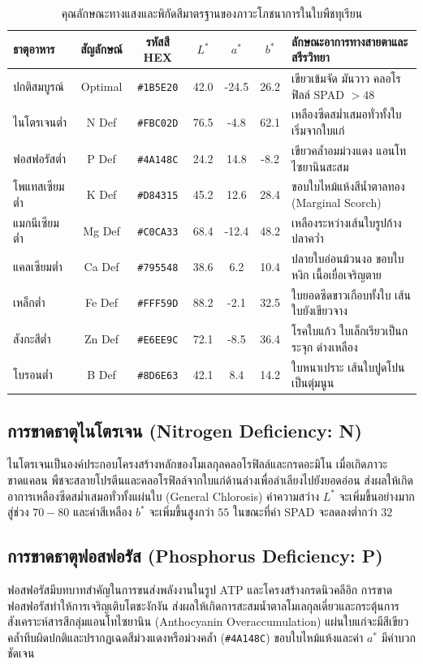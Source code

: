 \begin{table}[h]
\centering
\caption{คุณลักษณะทางแสงและพิกัดสีมาตรฐานของภาวะโภชนาการในใบพืชทุเรียน}
\label{tab:nutrient_color_profiles}
\small
\begin{tabular}{|l|c|c|c|c|c|l|}
\hline
\textbf{ธาตุอาหาร} & \textbf{สัญลักษณ์} & \textbf{รหัสสี HEX} & $L^*$ & $a^*$ & $b^*$ & \textbf{ลักษณะอาการทางสายตาและสรีรวิทยา} \\
\hline
ปกติสมบูรณ์ & Optimal & \texttt{\#1B5E20} & 42.0 & -24.5 & 26.2 & เขียวเข้มจัด มันวาว คลอโรฟิลล์ SPAD $>48$ \\
ไนโตรเจนต่ำ & N Def & \texttt{\#FBC02D} & 76.5 & -4.8 & 62.1 & เหลืองซีดสม่ำเสมอทั่วทั้งใบ เริ่มจากใบแก่ \\
ฟอสฟอรัสต่ำ & P Def & \texttt{\#4A148C} & 24.2 & 14.8 & -8.2 & เขียวคล้ำอมม่วงแดง แอนโทไซยานินสะสม \\
โพแทสเซียมต่ำ & K Def & \texttt{\#D84315} & 45.2 & 12.6 & 28.4 & ขอบใบไหม้แห้งสีน้ำตาลทอง (Marginal Scorch) \\
แมกนีเซียมต่ำ & Mg Def & \texttt{\#C0CA33} & 68.4 & -12.4 & 48.2 & เหลืองระหว่างเส้นใบรูปก้างปลาคว่ำ \\
แคลเซียมต่ำ & Ca Def & \texttt{\#795548} & 38.6 & 6.2 & 10.4 & ปลายใบอ่อนม้วนงอ ขอบใบหงิก เนื้อเยื่อเจริญตาย \\
เหล็กต่ำ & Fe Def & \texttt{\#FFF59D} & 88.2 & -2.1 & 32.5 & ใบยอดซีดขาวเกือบทั้งใบ เส้นใบยังเขียวจาง \\
สังกะสีต่ำ & Zn Def & \texttt{\#E6EE9C} & 72.1 & -8.5 & 36.4 & โรคใบแก้ว ใบเล็กเรียวเป็นกระจุก ด่างเหลือง \\
โบรอนต่ำ & B Def & \texttt{\#8D6E63} & 42.1 & 8.4 & 14.2 & ใบหนาเปราะ เส้นใบปูดโปนเป็นตุ่มนูน \\
\hline
\end{tabular}
\end{table}

\subsection{การขาดธาตุไนโตรเจน (Nitrogen Deficiency: N)}
ไนโตรเจนเป็นองค์ประกอบโครงสร้างหลักของโมเลกุลคลอโรฟิลล์และกรดอะมิโน เมื่อเกิดภาวะขาดแคลน พืชจะสลายโปรตีนและคลอโรฟิลล์จากใบแก่ด้านล่างเพื่อลำเลียงไปยังยอดอ่อน ส่งผลให้เกิดอาการเหลืองซีดสม่ำเสมอทั่วทั้งแผ่นใบ (General Chlorosis) ค่าความสว่าง $L^*$ จะเพิ่มขึ้นอย่างมากสู่ช่วง $70 - 80$ และค่าสีเหลือง $b^*$ จะเพิ่มขึ้นสูงกว่า $55$ ในขณะที่ค่า SPAD จะลดลงต่ำกว่า $32$

\subsection{การขาดธาตุฟอสฟอรัส (Phosphorus Deficiency: P)}
ฟอสฟอรัสมีบทบาทสำคัญในการขนส่งพลังงานในรูป ATP และโครงสร้างกรดนิวคลีอิก การขาดฟอสฟอรัสทำให้การเจริญเติบโตชะงักงัน ส่งผลให้เกิดการสะสมน้ำตาลโมเลกุลเดี่ยวและกระตุ้นการสังเคราะห์สารสีกลุ่มแอนโทไซยานิน (Anthocyanin Overaccumulation) แผ่นใบแก่จะมีสีเขียวคล้ำทึบผิดปกติและปรากฏเฉดสีม่วงแดงหรือม่วงคล้ำ (\texttt{\#4A148C}) ขอบใบไหม้แห้งและค่า $a^*$ มีค่าบวกชัดเจน

